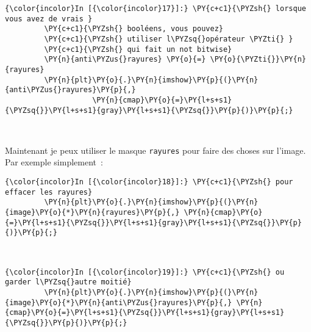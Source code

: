     \begin{Verbatim}[commandchars=\\\{\},frame=single,framerule=0.3mm,rulecolor=\color{cellframecolor}]
{\color{incolor}In [{\color{incolor}17}]:} \PY{c+c1}{\PYZsh{} lorsque vous avez de vrais }
         \PY{c+c1}{\PYZsh{} booléens, vous pouvez}
         \PY{c+c1}{\PYZsh{} utiliser l\PYZsq{}opérateur \PYZti{} }
         \PY{c+c1}{\PYZsh{} qui fait un not bitwise}
         \PY{n}{anti\PYZus{}rayures} \PY{o}{=} \PY{o}{\PYZti{}}\PY{n}{rayures}
         \PY{n}{plt}\PY{o}{.}\PY{n}{imshow}\PY{p}{(}\PY{n}{anti\PYZus{}rayures}\PY{p}{,}
                    \PY{n}{cmap}\PY{o}{=}\PY{l+s+s1}{\PYZsq{}}\PY{l+s+s1}{gray}\PY{l+s+s1}{\PYZsq{}}\PY{p}{)}\PY{p}{;}
\end{Verbatim}


    \begin{center}
    \end{center}
    { \hspace*{\fill} \\}
    
    Maintenant je peux utiliser le masque \texttt{rayures} pour faire des
choses sur l'image. Par exemple simplement~:

    \begin{Verbatim}[commandchars=\\\{\},frame=single,framerule=0.3mm,rulecolor=\color{cellframecolor}]
{\color{incolor}In [{\color{incolor}18}]:} \PY{c+c1}{\PYZsh{} pour effacer les rayures}
         \PY{n}{plt}\PY{o}{.}\PY{n}{imshow}\PY{p}{(}\PY{n}{image}\PY{o}{*}\PY{n}{rayures}\PY{p}{,} \PY{n}{cmap}\PY{o}{=}\PY{l+s+s1}{\PYZsq{}}\PY{l+s+s1}{gray}\PY{l+s+s1}{\PYZsq{}}\PY{p}{)}\PY{p}{;}
\end{Verbatim}


    \begin{center}
    \end{center}
    { \hspace*{\fill} \\}
    
    \begin{Verbatim}[commandchars=\\\{\},frame=single,framerule=0.3mm,rulecolor=\color{cellframecolor}]
{\color{incolor}In [{\color{incolor}19}]:} \PY{c+c1}{\PYZsh{} ou garder l\PYZsq{}autre moitié}
         \PY{n}{plt}\PY{o}{.}\PY{n}{imshow}\PY{p}{(}\PY{n}{image}\PY{o}{*}\PY{n}{anti\PYZus{}rayures}\PY{p}{,} \PY{n}{cmap}\PY{o}{=}\PY{l+s+s1}{\PYZsq{}}\PY{l+s+s1}{gray}\PY{l+s+s1}{\PYZsq{}}\PY{p}{)}\PY{p}{;}
\end{Verbatim}


